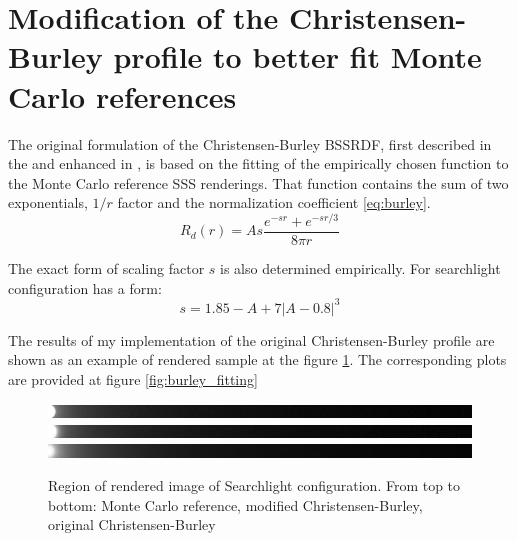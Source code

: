 \section{Modification of the Christensen-Burley profile to better fit Monte
Carlo references}

The original formulation of the Christensen-Burley BSSRDF, first described in the
\cite{Burley:disney_siggraph15} and enhanced in \cite{Christensen:2015:ARP:2775280.2792555}, is
based on the fitting of the empirically chosen function to the Monte Carlo reference SSS renderings.
That function contains the sum of two exponentials, $1/r$ factor and the normalization coefficient
\ref{eq:burley}.
\[ R_d(r) = As\dfrac{e^{-sr}+e^{-sr/3}}{8\pi r} \]

The exact form of scaling factor $s$ is also determined empirically. For searchlight
configuration has a form:
\begin{equation}
\label{eq:cb_scaling}
s=1.85-A + 7|A - 0.8|^3
\end{equation}

The results of my implementation of the original Christensen-Burley profile are shown as an example
of rendered sample at the figure \ref{fig:burley_searchlight_renders}. The corresponding plots are
provided at figure \ref{fig:burley_fitting}

\begin{figure}[h]
    \centering
    \includegraphics[width=\textwidth]{imgs/renders/cb_montecarlo_slice}
    \includegraphics[width=\textwidth]{imgs/renders/cb_modified_slice}
    \includegraphics[width=\textwidth]{imgs/renders/cb_original_slice}
    \caption{Region of rendered image of Searchlight configuration. From top to bottom: Monte Carlo
    reference, modified Christensen-Burley, original Christensen-Burley}
    \label{fig:burley_searchlight_renders}
\end{figure}

